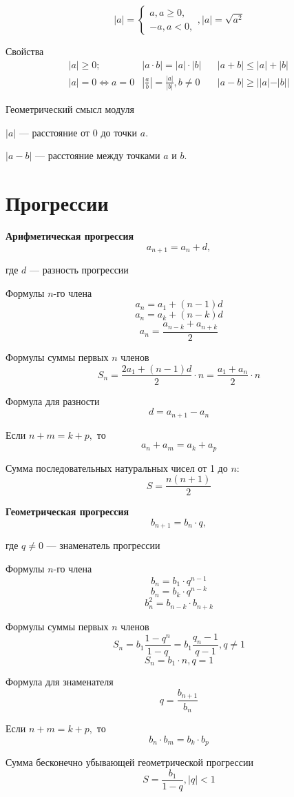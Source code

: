 \documentclass[a5paper, 8pt]{extarticle}
\begin{document}
$$|a|=\left\{
\begin{array}{l}
a, a\ge 0,\\
-a, a<0,
\end{array}
\right., 
|a|=\sqrt{a^2}
$$

Свойства
$$ 
\begin{array}{lll}
|a|\ge 0; \ \ \ \ \ & |a\cdot b|=|a|\cdot |b| \ \ \ \ & |a+b|\le |a|+|b|\\
|a|=0 \Leftrightarrow a=0 & \left| \frac{a}{b}\right|=\frac{|a|}{|b|}, b\not=0& |a-b|\ge ||a|-|b|| 
\end{array}
$$

Геометрический смысл модуля

$|a|$ --- расстояние от $0$ до точки $a.$

$|a-b|$ --- расстояние между точками $a$ и $b$.

\section{Прогрессии}

\textbf{Арифметическая прогрессия}
$$
a_{n+1}=a_n+d,$$ 

где $d$ --- разность  прогрессии

Формулы $n$-го члена
$$a_n=a_1+(n-1)d$$
$$a_n=a_k+(n-k)d$$
$$a_n=\frac{a_{n-k}+a_{n+k}}{2}$$

Формулы суммы первых $n$ членов
$$S_n=\frac{2a_1+(n-1)d}{2}\cdot n=\frac{a_1+a_n}{2}\cdot n$$

Формула для разности
$$d=a_{n+1}-a_n$$

Если $n+m=k+p,$ то
$$a_n+a_m=a_k+a_p$$

Сумма последовательных натуральных чисел от  1 до $n:$
$$S=\frac{n(n+1)}{2}$$

\textbf{Геометрическая прогрессия}
$$
b_{n+1}=b_n\cdot q,$$ 

где $q\not= 0$ --- знаменатель  прогрессии

Формулы $n$-го члена
$$b_n=b_1\cdot q^{n-1}$$
$$b_n=b_k\cdot q^{n-k}$$
$$b_n^2=b_{n-k}\cdot b_{n+k}$$

Формулы суммы первых $n$ членов
$$S_n=b_1\frac{1-q^n}{1-q}=b_1\frac{q_n-1}{q-1}, q\not=1$$
$$S_n=b_1\cdot n, q=1$$

Формула для знаменателя
$$q=\frac{b_{n+1}}{b_n}$$

Если $n+m=k+p,$ то
$$b_n\cdot b_m=b_k\cdot b_p$$

Сумма бесконечно убывающей геометрической прогрессии
$$S=\frac{b_1}{1-q}, |q|<1$$
\end{document}

